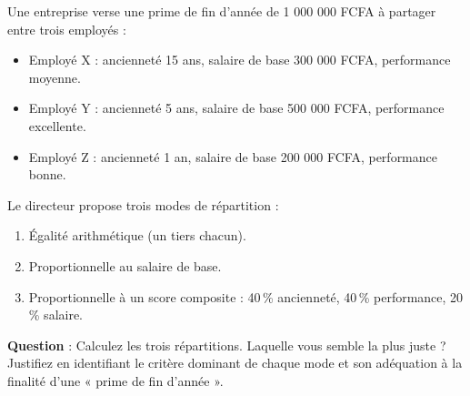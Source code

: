 \documentclass[11pt]{article}
\begin{document}
\begin{exercice}
Une entreprise verse une prime de fin d'année de 1 000 000 FCFA à partager entre trois employés :
\begin{itemize}
    \item Employé X : ancienneté 15 ans, salaire de base 300 000 FCFA, performance moyenne.
    \item Employé Y : ancienneté 5 ans, salaire de base 500 000 FCFA, performance excellente.
    \item Employé Z : ancienneté 1 an, salaire de base 200 000 FCFA, performance bonne.
\end{itemize}
Le directeur propose trois modes de répartition :
\begin{enumerate}
    \item Égalité arithmétique (un tiers chacun).
    \item Proportionnelle au salaire de base.
    \item Proportionnelle à un score composite : 40\,\% ancienneté, 40\,\% performance, 20\,\% salaire.
\end{enumerate}
\textbf{Question} : Calculez les trois répartitions. Laquelle vous semble la plus juste ? Justifiez en identifiant le critère dominant de chaque mode et son adéquation à la finalité d'une « prime de fin d'année ».
\end{exercice}
\end{document}
